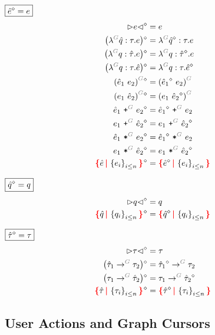 \noindent $\boxed{\hat{e}\mathclose{}^{\diamond}\mathclose{} = e}$
%
\begin{align*}
  \erase{\cursor{e}} &= e \\
  \erase{\left(\eFun{G}{\Z{q}}{\tau}{e}\right)} &= \eFun{G}{\erase{\Z{q}}}{\tau}{e} \\
  \erase{\left(\eFun{G}{q}{\Z{\tau}}{e}\right)} &= \eFun{G}{q}{\erase{\Z{\tau}}}{e} \\
  \erase{\left(\eFun{G}{q}{\tau}{\Z{e}}\right)} &= \eFun{G}{q}{\tau}{\erase{\Z{e}}} \\
  \erase{\eApp{G}{\Z{e}_1}{e_2}} &= \eApp{G}{\erase{\Z{e}_1}}{e_2} \\
  \erase{\eApp{G}{e_1}{\Z{e}_2}} &= \eApp{G}{e_1}{\erase{\Z{e}_2}} \\
  \erase{\ePlus{G}{\Z{e}_1}{e_2}} &= \ePlus{G}{\erase{\Z{e}_1}}{e_2} \\
  \erase{\ePlus{G}{e_1}{\Z{e}_2}} &= \ePlus{G}{e_1}{\erase{\Z{e}_2}} \\
  \erase{\eTimes{G}{\Z{e}_1}{e_2}} &= \eTimes{G}{\erase{\Z{e}_1}}{e_2} \\
  \erase{\eTimes{G}{e_1}{\Z{e}_2}} &= \eTimes{G}{e_1}{\erase{\Z{e}_2}} \\
  \erase{\conflictHole{\Z{e}, \SetOf{e_i}_{i \leq n}}} &= \conflictHole{\erase{\Z{e}}, \SetOf{e_i}_{i \leq n}}
\end{align*}

\noindent $\boxed{\hat{q}\mathclose{}^{\diamond}\mathclose{} = q}$
%
\begin{align*}
  \erase{\cursor{q}} &= q \\
  \erase{\conflictHole{\Z{q}, \SetOf{q_i}_{i \leq n}}} &= \conflictHole{\erase{\Z{q}}, \SetOf{q_i}_{i \leq n}}
\end{align*}

\noindent $\boxed{\hat{\tau}\mathclose{}^{\diamond}\mathclose{} = \tau}$
%
\begin{align*}
  \erase{\cursor{\tau}} &= \tau \\
  \erase{\left(\tArrow{G}{\Z{\tau}_1}{\tau_2}\right)} &= \tArrow{G}{\erase{\Z{\tau}_1}}{\tau_2} \\
  \erase{\left(\tArrow{G}{\tau_1}{\Z{\tau}_2}\right)} &= \tArrow{G}{\tau_1}{\erase{\Z{\tau}_2}} \\
  \erase{\conflictHole{\Z{\tau}, \SetOf{\tau_i}_{i \leq n}}} &= \conflictHole{\erase{\Z{\tau}}, \SetOf{\tau_i}_{i \leq n}}
\end{align*}


\subsection{User Actions and Graph Cursors}

